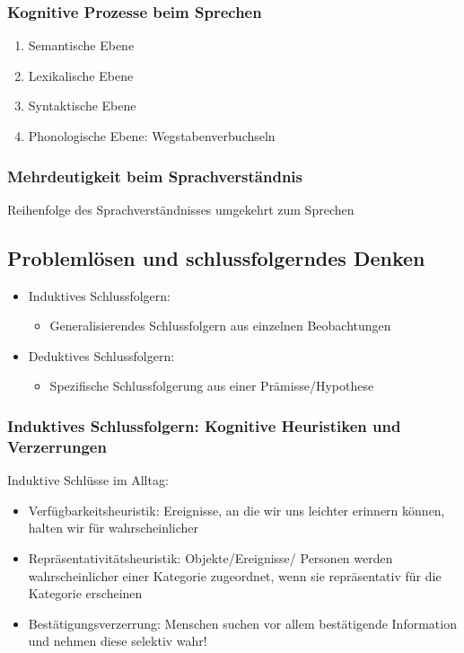 \subsubsection{Kognitive Prozesse beim Sprechen}
\begin{enumerate}
	\item Semantische Ebene
	\item Lexikalische Ebene
	\item Syntaktische Ebene
	\item Phonologische Ebene: Wegstabenverbuchseln
\end{enumerate}
\subsubsection{Mehrdeutigkeit beim Sprachverständnis}
Reihenfolge des Sprachverständnisses umgekehrt zum Sprechen
\subsection{Problemlösen und schlussfolgerndes Denken}
\begin{itemize}
	\item Induktives Schlussfolgern:
		\begin{itemize}
			\item Generalisierendes Schlussfolgern aus einzelnen Beobachtungen 
		\end{itemize}
	\item Deduktives Schlussfolgern:
		\begin{itemize}
			\item Spezifische Schlussfolgerung aus einer Prämisse/Hypothese
		\end{itemize}
\end{itemize}
\subsubsection{Induktives Schlussfolgern: Kognitive Heuristiken und Verzerrungen}
Induktive Schlüsse im Alltag:
\begin{itemize}
	\item Verfügbarkeitsheuristik: Ereignisse, an die wir uns leichter erinnern können, halten wir für wahrscheinlicher
	\item Repräsentativitätsheuristik: Objekte/Ereignisse/ Personen werden wahrscheinlicher einer Kategorie zugeordnet, wenn sie repräsentativ für die Kategorie erscheinen
	\item Bestätigungsverzerrung: Menschen suchen vor allem bestätigende Information und nehmen diese selektiv wahr!
\end{itemize}
